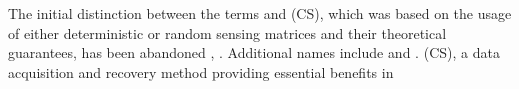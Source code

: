 {  %
  The initial distinction between
  the terms
   and
   (\acs{CS}), which was based on
  the usage of either
  deterministic or
  random sensing matrices and their
  theoretical guarantees, has been abandoned
  \cite[2]{book:Foucart2013},
  \cite{article:KutyniokGAMM2013}.
  Additional names include
  \cite{article:BaraniukSPM2007} and
  \cite{article:CandesSPM2008}.
} (\acs{CS}),
a data acquisition and
recovery method providing
essential benefits in
